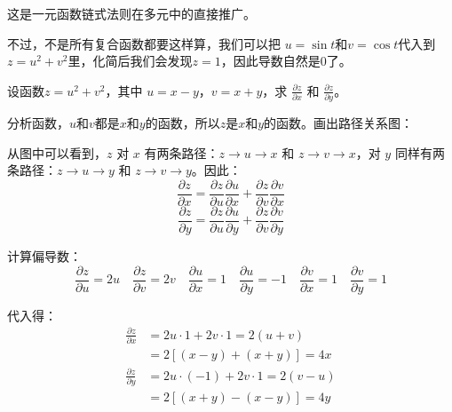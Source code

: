 这是一元函数链式法则在多元中的直接推广。

不过，不是所有复合函数都要这样算，我们可以把 $u = \sin t$和$v = \cos t$代入到$z=u^2+v^2$里，化简后我们会发现$z=1$，因此导数自然是$0$了。


\begin{myexample}
  设函数$z=u^2+v^2$，其中 $u = x-y$，$v = x+y$，求 $\frac{\partial z}{\partial x}$ 和 $\frac{\partial z}{\partial y}$。

分析函数，$u$和$v$都是$x$和$y$的函数，所以$z$是$x$和$y$的函数。画出路径关系图：

\begin{center}
\end{center}

从图中可以看到，$z$ 对 $x$ 有两条路径：$z \to u \to x$ 和 $z \to v \to x$，对 $y$ 同样有两条路径：$z \to u \to y$ 和 $z \to v \to y$。因此：
  \[
  \frac{\partial z}{\partial x} = \frac{\partial z}{\partial u}\frac{\partial u}{\partial x}
    + \frac{\partial z}{\partial v}\frac{\partial v}{\partial x}
  \]
  \[
  \frac{\partial z}{\partial y} = \frac{\partial z}{\partial u}\frac{\partial u}{\partial y}
    + \frac{\partial z}{\partial v}\frac{\partial v}{\partial y}
  \]

  计算偏导数：
  \[
  \frac{\partial z}{\partial u} = 2u \quad \frac{\partial z}{\partial v} = 2v
  \quad
  \frac{\partial u}{\partial x} = 1 \quad \frac{\partial u}{\partial y} = -1
  \quad
  \frac{\partial v}{\partial x} = 1 \quad \frac{\partial v}{\partial y} = 1
  \]

  代入得：
  \begin{align*}
    \frac{\partial z}{\partial x}
    &= 2u \cdot 1 + 2v \cdot 1 = 2(u+v) \\
    &= 2[(x-y)+(x+y)] = 4x\\[4pt]
    \frac{\partial z}{\partial y}
    &= 2u \cdot (-1) + 2v \cdot 1 = 2(v-u) \\
    &= 2[(x+y)-(x-y)] = 4y
  \end{align*}

\end{myexample}

